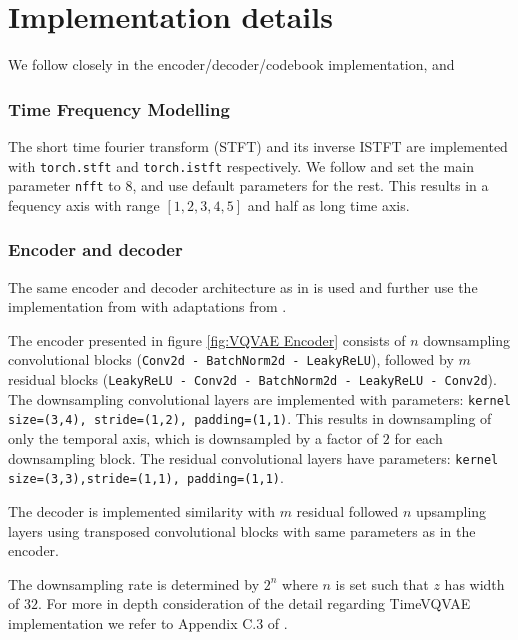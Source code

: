 \documentclass[../../thesis.tex]{subfiles}
\begin{document}
\section{Implementation details}
We follow \cite{TimeVQVAE} closely in the encoder/decoder/codebook implementation, and 

\subsubsection{Time Frequency Modelling}
The short time fourier transform (STFT) and its inverse ISTFT are implemented with \texttt{torch.stft} and \texttt{torch.istft} respectively. We follow \cite{TimeVQVAE} and set the main parameter \texttt{nfft} to $8$, and use default parameters for the rest. This results in a fequency axis with range $[1,2,3,4,5]$ and half as long time axis. \newline


\subsubsection{Encoder and decoder}

The same encoder and decoder architecture as in \cite{VQVAE} is used and further use the implementation from \cite{nadavbh12} with adaptations from \cite{TimeVQVAE}.\newline

The encoder presented in figure \ref{fig:VQVAE Encoder} consists of $n$ downsampling convolutional blocks (\texttt{Conv2d - BatchNorm2d - LeakyReLU}), followed by $m$ residual blocks (\texttt{LeakyReLU - Conv2d - BatchNorm2d - LeakyReLU - Conv2d}). The downsampling convolutional layers are implemented with parameters: \texttt{kernel size=(3,4), stride=(1,2), padding=(1,1)}. This results in downsampling of only the temporal axis, which is downsampled by a factor of $2$ for each downsampling block. The residual convolutional layers have parameters: \texttt{kernel size=(3,3),stride=(1,1), padding=(1,1)}.\newline

The decoder is implemented similarity with $m$ residual followed $n$ upsampling layers using transposed convolutional blocks with same parameters as in the encoder.\newline

The downsampling rate is determined by $2^n$ where $n$ is set such that $z$ has width of $32$. For more in depth consideration of the detail regarding TimeVQVAE implementation we refer to Appendix C.3 of \cite{TimeVQVAE}.
\end{document}
